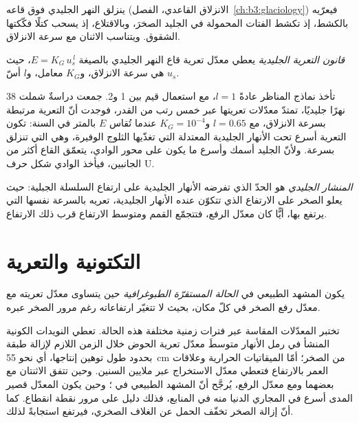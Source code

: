 ينزلق النهر الجليدي فوق قاعه (الانزلاق القاعدي،
الفصل~\ref{ch:b3:glaciology}) فيعرّيه بالكشط، إذ تكشط الفتات المحمولة في الجليد الصخرَ،
وبالاقتلاع، إذ يسحب كتلًا فكّكتها
الشقوق. ويتناسب الاثنان مع سرعة الانزلاق.

\begin{definition}\label{def:b3:quantitative-geomorphology:glacial}
\emph{قانون التعرية الجليدية} يعطي معدّل تعرية قاع النهر الجليدي
بالصيغة $E = K_G\,u_s^{\,l}$، حيث $u_s$ هي
سرعة الانزلاق، و$K_G$ معامل، و$l$ أسّ.
\end{definition}

تأخذ نماذج المناظر عادةً $l = 1$، مع استعمال قيم بين 1 و2.
جمعت دراسةٌ شملت 38 نهرًا جليديًا، تمتدّ معدّلات تعريتها عبر
خمس رتب من القدر، فوجدت أنّ التعرية مرتبطة بسرعة الانزلاق، مع $l = 0.65$
و$K_G = 10^{-4}$ عندما تُقاس $E$ بالمتر في السنة: تكون التعرية أسرع تحت الأنهار الجليدية المعتدلة
التي تغذّيها الثلوج الوفيرة، وهي التي تنزلق بسرعة. ولأنّ الجليد أسمك
وأسرع ما يكون على محور الوادي، يتعمّق القاع أكثر من
الجانبين، فيأخذ الوادي شكل حرف U.

\begin{definition}\label{def:b3:quantitative-geomorphology:buzzsaw}
\emph{المنشار الجليدي} هو الحدّ الذي تفرضه الأنهار الجليدية على
ارتفاع السلسلة الجبلية: حيث يعلو الصخر على الارتفاع
الذي تتكوّن عنده الأنهار الجليدية، تعريه بالسرعة نفسها التي يرتفع بها، أيًّا كان
معدّل الرفع، فتتجمّع القمم ومتوسط الارتفاع قرب ذلك الارتفاع.
\end{definition}

\section{التكتونية والتعرية}\label{sec:b3:quantitative-geomorphology:tectonics}

\begin{definition}\label{def:b3:quantitative-geomorphology:steady-state}
يكون المشهد الطبيعي في \emph{الحالة المستقرّة الطبوغرافية}
حين يتساوى معدّل تعريته مع معدّل رفع الصخر في كلّ مكان، بحيث
لا تتغيّر ارتفاعاته رغم مرور الصخر عبره.
\end{definition}

تختبر المعدّلات المقاسة عبر فترات زمنية مختلفة هذه الحالة. تعطي النويدات
الكونية المنشأ في رمل الأنهار متوسطَ معدّل تعرية الحوض خلال الزمن
اللازم لإزالة طبقة بحدود طول توهين إنتاجها،
أي نحو \qty{55}{cm} من الصخر؛ أمّا الميقاتيات الحرارية وعلاقات العمر بالارتفاع فتعطي
معدّل الاستخراج عبر ملايين السنين. وحين تتفق الاثنتان مع بعضهما
ومع معدّل الرفع، يُرجَّح أنّ المشهد الطبيعي في ؛ وحين
يكون المعدّل قصير المدى أسرع في المجاري الدنيا منه في المنابع،
فذلك دليل على مرور نقطة انقطاع. كما أنّ إزالة الصخر تخفّف الحمل عن
الغلاف الصخري، فيرتفع استجابةً لذلك.

